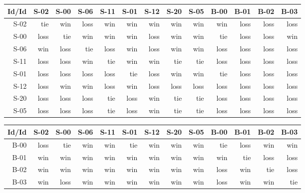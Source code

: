 \begin{tabular}{ | r | r | r | r | r | r | r | r | r | r | r | r | r | }
    \hline
        Id/Id  &   S-02  &   S-00  &   S-06  &   S-11  &   S-01  &   S-12  &   S-20  &   S-05  &   B-00  &   B-01  &   B-02  &   B-03  \\
    \hline
    \hline
         S-02  &    tie  &    win  &   loss  &    win  &    win  &    win  &    win  &    win  &    win  &   loss  &   loss  &   loss  \\
    \hline
         S-00  &   loss  &    tie  &    win  &    win  &    win  &   loss  &    win  &    win  &    tie  &   loss  &   loss  &    win  \\
    \hline
         S-06  &    win  &   loss  &    tie  &   loss  &    win  &   loss  &    win  &    win  &   loss  &   loss  &   loss  &   loss  \\
    \hline
         S-11  &   loss  &   loss  &    win  &    tie  &    win  &    win  &    tie  &    tie  &   loss  &   loss  &   loss  &   loss  \\
    \hline
         S-01  &   loss  &   loss  &   loss  &   loss  &    tie  &   loss  &    win  &    win  &    tie  &   loss  &   loss  &   loss  \\
    \hline
         S-12  &   loss  &    win  &    win  &   loss  &    win  &   loss  &   loss  &   loss  &   loss  &   loss  &   loss  &   loss  \\
    \hline
         S-20  &   loss  &   loss  &   loss  &    tie  &   loss  &    win  &    tie  &    tie  &   loss  &   loss  &   loss  &   loss  \\
    \hline
         S-05  &   loss  &   loss  &   loss  &    tie  &   loss  &    win  &    tie  &    tie  &   loss  &   loss  &   loss  &   loss  \\
    \hline
\end{tabular}


\begin{tabular}{ | r | r | r | r | r | r | r | r | r | r | r | r | r | }
    \hline
        Id/Id  &   S-02  &   S-00  &   S-06  &   S-11  &   S-01  &   S-12  &   S-20  &   S-05  &   B-00  &   B-01  &   B-02  &   B-03  \\
    \hline
    \hline
         B-00  &   loss  &    tie  &    win  &    win  &    tie  &    win  &    win  &    win  &    tie  &   loss  &    win  &    win  \\
    \hline
         B-01  &    win  &    win  &    win  &    win  &    win  &    win  &    win  &    win  &    win  &    tie  &   loss  &   loss  \\
    \hline
         B-02  &    win  &    win  &    win  &    win  &    win  &    win  &    win  &    win  &   loss  &    win  &    tie  &   loss  \\
    \hline
         B-03  &    win  &   loss  &    win  &    win  &    win  &    win  &    win  &    win  &   loss  &    win  &    win  &    tie  \\
    \hline
\end{tabular}


